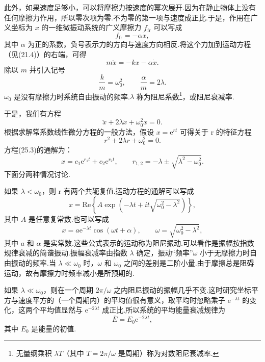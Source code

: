 此外，如果速度足够小，可以将摩擦力按速度的幂次展开.因为在静止物体上没有任何摩擦力作用，所以零次项为零.不为零的第一项与速度成正比.于是，作用在广义坐标为 $x$ 的一维微振动系统的广义摩擦力 $f_{\mathrm{fr}}$ 可以写成
\begin{equation*}
  f_{\mathrm{fr}}=-\alpha\dot{x},
\end{equation*}
其中 $\alpha$ 为正的系数，负号表示力的方向与速度方向相反.将这个力加到运动方程（见(21.4)）的右端，可得
\begin{equation}
  m\ddot{x}=-kx-\alpha\dot{x}.
\end{equation}
除以 $m$ 并引入记号
\begin{equation}
  \frac{k}{m}=\omega_0^2,\qquad
  \frac{\alpha}{m}=2\lambda.
\end{equation}
$\omega_0$ 是没有摩擦力时系统自由振动的频率.$\lambda$ 称为阻尼系数\footnote{无量纲乘积 $\lambda T$（其中 $T=2\pi/\omega$ 是周期）称为对数阻尼衰减率.}，或阻尼衰减率.

于是，我们有方程
\begin{equation}
  \ddot{x}+2\lambda\dot{x}+\omega_0^2x=0.
\end{equation}
根据求解常系数线性微分方程的一般方法，假设 $x=\mathrm{e}^{rt}$ 可得关于 r 的特征方程
\begin{equation*}
  r^2+2\lambda r+\omega_0^2=0.
\end{equation*}
方程(25.3)的通解为：
\begin{equation*}
  x=c_1\mathrm{e}^{r_1t}+c_2\mathrm{e}^{r_2t},\qquad
  r_{1,2}=-\lambda\pm\sqrt{\lambda^2-\omega_0^2}.
\end{equation*}
下面分两种情况讨论.

如果 $\lambda<\omega_0$，则 r 有两个共轭复值.运动方程的通解可以写成
\begin{equation*}
  x=\mathrm{Re}\left\{A\exp\left(-\lambda t+it\sqrt{\omega_0^2-\lambda^2}\right)\right\},
\end{equation*}
其中 $A$ 是任意复常数.也可以写成
\begin{equation}
  x=a\mathrm{e}^{-\lambda t}\cos(\omega t+\alpha),\qquad
  \omega=\sqrt{\omega_0^2-\lambda^2},
\end{equation}
其中 $a$ 和 $\alpha$ 是实常数.这些公式表示的运动称为阻尼振动.可以看作是振幅按指数规律衰减的简谐振动.振幅衰减率由指数 $\lambda$ 确定，振动“频率”$\omega$ 小于无摩擦力时自由振动的频率.当 $\lambda\ll\omega_0$ 时，$\omega$ 和 $\omega_0$ 之间的差别是二阶小量.由于摩擦总是阻碍运动，故有摩擦力时频率减小是所预期的.

如果 $\lambda\ll\omega_0$，则在一个周期 $2\pi/\omega$ 之内阻尼振动的振幅几乎不变.这时研究坐标平方与速度平方的（一个周期内）的平均值很有意义，取平均时忽略乘子 $\mathrm{e}^{-\lambda t}$ 的变化，这两个平均值显然与 $\mathrm{e}^{-2\lambda t}$ 成正比.所以系统的平均能量衰减规律为
\begin{equation}
  \overline{E}=E_0\mathrm{e}^{-2\lambda t},
\end{equation}
其中 $E_0$ 是能量的初值.

